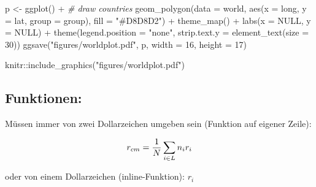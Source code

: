\documentclass[
  11pt,
]{article}
\newenvironment{Shaded}{\begin{snugshade}}{\end{snugshade}}
\newcommand{\AttributeTok}[1]{\textcolor[rgb]{0.77,0.63,0.00}{#1}}
\newcommand{\CommentTok}[1]{\textcolor[rgb]{0.56,0.35,0.01}{\textit{#1}}}
\newcommand{\ConstantTok}[1]{\textcolor[rgb]{0.00,0.00,0.00}{#1}}
\newcommand{\DecValTok}[1]{\textcolor[rgb]{0.00,0.00,0.81}{#1}}
\newcommand{\FunctionTok}[1]{\textcolor[rgb]{0.00,0.00,0.00}{#1}}
\newcommand{\NormalTok}[1]{#1}
\newcommand{\OtherTok}[1]{\textcolor[rgb]{0.56,0.35,0.01}{#1}}
\newcommand{\SpecialCharTok}[1]{\textcolor[rgb]{0.00,0.00,0.00}{#1}}
\newcommand{\StringTok}[1]{\textcolor[rgb]{0.31,0.60,0.02}{#1}}
\begin{document}
\small

\linespread{1}

\begin{Shaded}
\begin{Highlighting}[]
\NormalTok{p }\OtherTok{\textless{}{-}} \FunctionTok{ggplot}\NormalTok{() }\SpecialCharTok{+} 
  \CommentTok{\# draw countries}
  \FunctionTok{geom\_polygon}\NormalTok{(}\AttributeTok{data =}\NormalTok{ world, }\FunctionTok{aes}\NormalTok{(}\AttributeTok{x =}\NormalTok{ long, }
                                       \AttributeTok{y =}\NormalTok{ lat, }
                                       \AttributeTok{group =}\NormalTok{ group), }
                 \AttributeTok{fill =} \StringTok{"\#D8D8D2"}\NormalTok{) }\SpecialCharTok{+}
  \FunctionTok{theme\_map}\NormalTok{() }\SpecialCharTok{+}
  \FunctionTok{labs}\NormalTok{(}\AttributeTok{x =} \ConstantTok{NULL}\NormalTok{,}
       \AttributeTok{y =} \ConstantTok{NULL}\NormalTok{) }\SpecialCharTok{+}
  \FunctionTok{theme}\NormalTok{(}\AttributeTok{legend.position =} \StringTok{"none"}\NormalTok{,}
        \AttributeTok{strip.text.y =} \FunctionTok{element\_text}\NormalTok{(}\AttributeTok{size =} \DecValTok{30}\NormalTok{))}
\FunctionTok{ggsave}\NormalTok{(}\StringTok{"figures/worldplot.pdf"}\NormalTok{, p, }\AttributeTok{width =} \DecValTok{16}\NormalTok{, }\AttributeTok{height =} \DecValTok{17}\NormalTok{)}
\end{Highlighting}
\end{Shaded}

\linespread{1.5}

\normalsize

\small

\linespread{1}

\begin{Shaded}
\begin{Highlighting}[]
\NormalTok{knitr}\SpecialCharTok{::}\FunctionTok{include\_graphics}\NormalTok{(}\StringTok{"figures/worldplot.pdf"}\NormalTok{)}
\end{Highlighting}
\end{Shaded}

\linespread{1.5}

\normalsize

\hypertarget{funktionen}{%
\subsection{Funktionen:}\label{funktionen}}

Müssen immer von zwei Dollarzeichen umgeben sein (Funktion auf eigener Zeile):

\[r_{cm} = {1 \over N} \sum_{i \in L} n_{i}r_{i}\]

oder von einem Dollarzeichen (inline-Funktion): \(r_{i}\)
\end{document}
